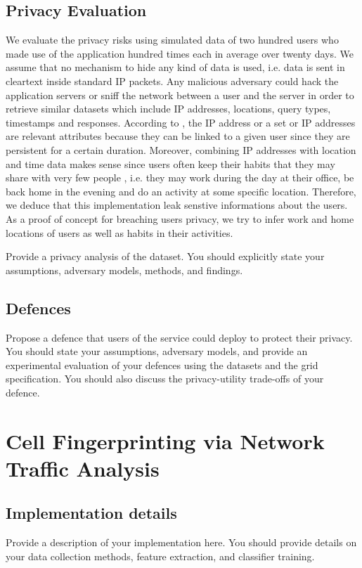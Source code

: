 \documentclass[10pt,conference,compsocconf]{IEEEtran}
\begin{document}
\subsection{Privacy Evaluation}
We evaluate the privacy risks using simulated data of two hundred users who made use of the application hundred times each in average over twenty days. We assume that no mechanism to hide any kind of data is used, i.e. data is sent in cleartext inside standard IP packets. Any malicious adversary could hack the application servers or sniff the network between a user and the server in order to retrieve similar datasets which include IP addresses, locations, query types, timestamps and responses. According to \cite{dont}, the IP address or a set or IP addresses are relevant attributes because they can be linked to a given user since they are persistent for a certain duration. Moreover, combining IP addresses with location and time data makes sense since users often keep their habits that they may share with very few people \cite{on}, i.e. they may work during the day at their office, be back home in the evening and do an activity at some specific location. Therefore, we deduce that this implementation leak senstive informations about the users. As a proof of concept for breaching users privacy, we try to infer work and home locations of users as well as habits in their activities.

Provide a privacy analysis of the dataset. You should explicitly state your assumptions, adversary
models, methods, and findings.

\subsection{Defences}
Propose a defence that users of the service could deploy to protect their privacy.  You
should state your assumptions, adversary models, and provide an experimental evaluation of your
defences using the datasets and the grid specification. You should also discuss the
privacy-utility trade-offs of your defence.

\section{Cell Fingerprinting via Network Traffic Analysis}

\subsection{Implementation details}
Provide a description of your implementation here. You should provide details on your data collection methods, feature extraction, and classifier training.
\end{document}
